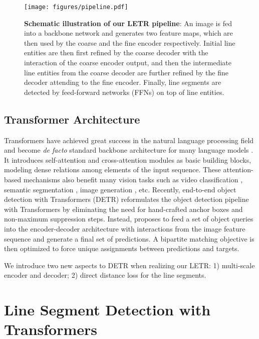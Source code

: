 \documentclass[final]{cvpr}
\begin{document}
\begin{figure*}
\centering
\texttt{[image: figures/pipeline.pdf]}
\vspace{-0.2cm}
\caption{\textbf{Schematic illustration of our LETR pipeline}: An image is fed into a backbone network and generates two feature maps, which are then used by the coarse and the fine encoder respectively. Initial line entities are then first refined by the coarse decoder with the interaction of the coarse encoder output, and then the intermediate line entities from the coarse decoder are further refined by the fine decoder attending to the fine encoder. Finally, line segments are detected by feed-forward networks (FFNs) on top of line entities.}
\label{model}
\label{fig:pipeline}
\end{figure*}


\subsection{Transformer Architecture}
\vspace{-2mm}
Transformers \cite{vaswani2017attention} have achieved great success in the natural language processing field and become \textit{de facto} standard backbone architecture for many language models \cite{vaswani2017attention,devlin2018bert}. It introduces self-attention and cross-attention modules as basic building blocks, modeling dense relations among elements of the input sequence. These attention-based mechanisms also benefit many vision tasks such as video classification \cite{wang2018non}, semantic segmentation \cite{fu2019dual}, image generation \cite{zhang2019self}, etc. Recently, end-to-end object detection with Transformers (DETR) \cite{carion2020end} reformulates the object detection pipeline with Transformers by eliminating the need for hand-crafted anchor boxes and non-maximum suppression steps. Instead, \cite{carion2020end} proposes to feed a set of object queries into the encoder-decoder architecture with interactions from the image feature sequence and generate a final set of predictions. A bipartite matching objective is then optimized to force unique assignments between predictions and targets. 

We introduce two new aspects to DETR \cite{carion2020end} when realizing our LETR: 1) multi-scale encoder and decoder; 2) direct distance loss for the line segments.




\section{Line Segment Detection with Transformers}
\end{document}
